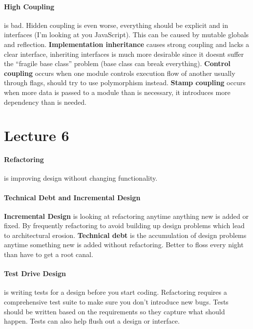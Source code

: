 \documentclass{article}
\begin{document}
\paragraph{High Coupling} %
\label{par:high_coupling}
is bad. Hidden coupling is even worse, everything should be explicit and in interfaces (I'm looking at you JavaScript). This can be caused by mutable globals and reflection. \textbf{Implementation inheritance} causes strong coupling and lacks a clear interface, inheriting interfaces is much more desirable since it doesnt suffer the ``fragile base class'' problem (base class can break everything). \textbf{Control coupling} occurs when one module controls execution flow of another usually through flags, should try to use polymorphism instead. \textbf{Stamp coupling} occurs when more data is passed to a module than is necessary, it introduces more dependency than is needed.


\section*{Lecture 6} %
\label{sec:lecture_6}
\paragraph{Refactoring}
\label{par:refactoring}
is improving design without changing functionality.

\paragraph{Technical Debt and Incremental Design} %
\label{par:technical_debt_and_incremental_design}
\textbf{Incremental Design} is looking at refactoring anytime anything new is added or fixed. By frequently refactoring to avoid building up design problems which lead to architectural erosion. \textbf{Technical debt} is the accumulation of design problems anytime something new is added without refactoring. Better to floss every night than have to get a root canal.

\paragraph{Test Drive Design} %
\label{par:test_drive_design}
is writing tests for a design before you start coding. Refactoring requires a comprehensive test suite to make sure you don't introduce new bugs. Tests should be written based on the requirements so they capture what should happen. Tests can also help flush out a design or interface.
\end{document}
